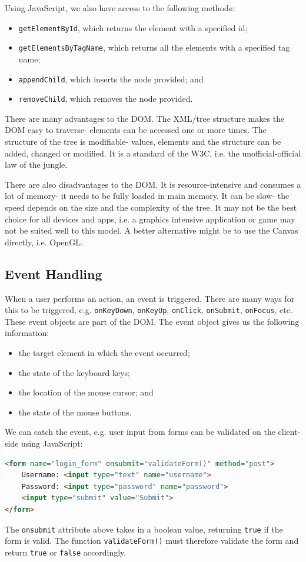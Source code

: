 \documentclass[a4paper, openany]{memoir}
\begin{document}
Using JavaScript, we also have access to the following methods:
\begin{itemize}
    \item \texttt{getElementById}, which returns the element with a specified id;
    \item \texttt{getElementsByTagName}, which returns all the elements with a specified tag name;
    \item \texttt{appendChild}, which inserts the node provided; and
    \item \texttt{removeChild}, which removes the node provided.
\end{itemize}
There are many advantages to the DOM. The XML/tree structure makes the DOM easy to traverse- elements can be accessed one or more times. The structure of the tree is modifiable- values, elements and the structure can be added, changed or modified. It is a standard of the W3C, i.e. the unofficial-official law of the jungle.

\noindent There are also disadvantages to the DOM. It is resource-intensive and consumes a lot of memory- it needs to be fully loaded in main memory. It can be slow- the speed depends on the size and the complexity of the tree. It may not be the best choice for all devices and apps, i.e. a graphics intensive application or game may not be suited well to this model. A better alternative might be to use the Canvas directly, i.e. OpenGL.

\subsection{Event Handling}
When a user performs an action, an event is triggered. There are many ways for this to be triggered, e.g. \texttt{onKeyDown}, \texttt{onKeyUp}, \texttt{onClick}, \texttt{onSubmit}, \texttt{onFocus}, etc. These event objects are part of the DOM. The event object gives us the following information:
\begin{itemize}
    \item the target element in which the event occurred;
    \item the state of the keyboard keys;
    \item the location of the mouse cursor; and
    \item the state of the mouse buttons.
\end{itemize}
We can catch the event, e.g. user input from forms can be validated on the client-side using JavaScript:
\begin{lstlisting}[language=html]
<form name="login_form" onsubmit="validateForm()" method="post">
    Username: <input type="text" name="username">
    Password: <input type="password" name="password">
    <input type="submit" value="Submit">
</form>
\end{lstlisting}
The \texttt{onsubmit} attribute above takes in a boolean value, returning \texttt{true} if the form is valid. The function \texttt{validateForm()} must therefore validate the form and return \texttt{true} or \texttt{false} accordingly.
\end{document}
